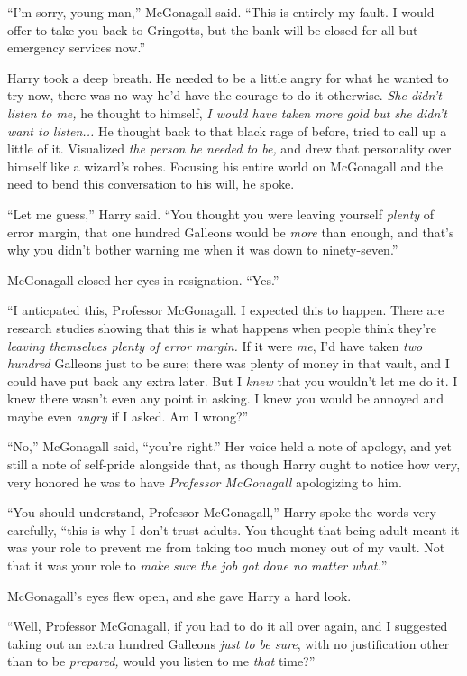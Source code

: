“I’m sorry, young man,” McGonagall said. “This is entirely my fault. I would offer to take you back to Gringotts, but the bank will be closed for all but emergency services now.”

Harry took a deep breath. He needed to be a little angry for what he wanted to try now, there was no way he’d have the courage to do it otherwise. \emph{She didn’t listen to me,} he thought to himself, \emph{I would have taken more gold but she didn’t want to listen...} He thought back to that black rage of before, tried to call up a little of it. Visualized \emph{the person he needed to be,} and drew that personality over himself like a wizard’s robes. Focusing his entire world on McGonagall and the need to bend this conversation to his will, he spoke.

“Let me guess,” Harry said. “You thought you were leaving yourself \emph{plenty} of error margin, that one hundred Galleons would be \emph{more} than enough, and that’s why you didn’t bother warning me when it was down to ninety-seven.”

McGonagall closed her eyes in resignation. “Yes.”

“I anticpated this, Professor McGonagall. I expected this to happen. There are research studies showing that this is what happens when people think they’re \emph{leaving themselves plenty of error margin.} If it were \emph{me}, I’d have taken \emph{two hundred} Galleons just to be sure; there was plenty of money in that vault, and I could have put back any extra later. But I \emph{knew} that you wouldn’t let me do it. I knew there wasn’t even any point in asking. I knew you would be annoyed and maybe even \emph{angry} if I asked. Am I wrong?”

“No,” McGonagall said, “you’re right.” Her voice held a note of apology, and yet still a note of self-pride alongside that, as though Harry ought to notice how very, very honored he was to have \emph{Professor McGonagall} apologizing to him.

“You should understand, Professor McGonagall,” Harry spoke the words very carefully, “this is why I don’t trust adults. You thought that being adult meant it was your role to prevent me from taking too much money out of my vault. Not that it was your role to \emph{make sure the job got done no matter what.}”

McGonagall’s eyes flew open, and she gave Harry a hard look.

“Well, Professor McGonagall, if you had to do it all over again, and I suggested taking out an extra hundred Galleons \emph{just to be sure}, with no justification other than to be \emph{prepared,} would you listen to me \emph{that} time?”

